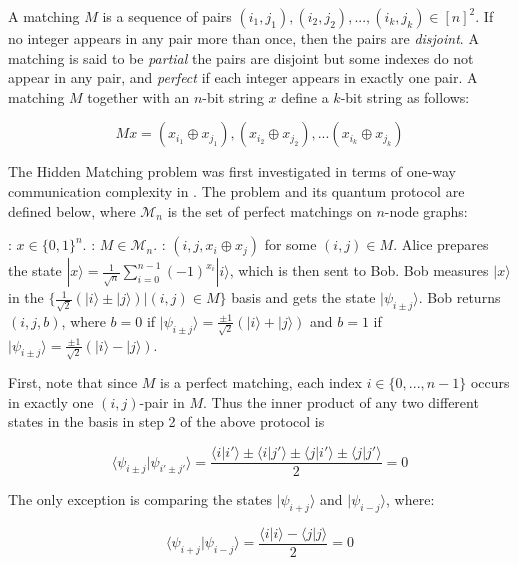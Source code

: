 \documentclass[a4paper]{article}
\begin{document}
        A matching $M$ is a sequence of pairs $(i_1, j_1), (i_2, j_2),...,(i_k, j_k) \in [n]^2$. If no integer appears in any pair more than once, then the pairs are {\em disjoint}. A matching is said to be {\em partial} the pairs are disjoint but some indexes do not appear in any pair, and {\em perfect} if each integer appears in exactly one pair. A matching $M$ together with an $n$-bit string $x$ define a $k$-bit string as follows:

        $$Mx = (x_{i_1} \oplus x_{j_1}), (x_{i_2} \oplus x_{j_2}), ... (x_{i_k} \oplus x_{j_k})$$

        The Hidden Matching problem was first investigated in terms of one-way communication complexity in \cite{doi:10.1137/060651835}. The problem and its quantum protocol are defined below, where $\mathcal{M}_n$ is the set of perfect matchings on $n$-node graphs:

        \begin{codebox}
            \zi {}: $x \in \{0,1\}^n$.
            \zi {}: $M \in \mathcal{M}_n$.
            \zi {}: $(i, j, x_i\oplus x_j)$ for some $(i, j) \in M$.
            \li Alice prepares the state $|x\rangle = \frac{1}{\sqrt{n}}\sum_{i = 0}^{n - 1}(-1)^{x_i}|i\rangle$, which is then sent to Bob.
            \li Bob measures $|x\rangle$ in the $\{\frac{1}{\sqrt{2}}(|i\rangle\pm|j\rangle)|(i, j) \in M\}$ basis and gets the state $|\psi_{i\pm j}\rangle$.
            \li Bob returns $(i, j, b)$, where $b = 0$ if $|\psi_{i\pm j}\rangle = \frac{\pm 1}{\sqrt{2}}(|i\rangle+|j\rangle)$ and $b = 1$ if $|\psi_{i\pm j}\rangle = \frac{\pm 1}{\sqrt{2}}(|i\rangle-|j\rangle)$.
        \end{codebox}

        First, note that since $M$ is a perfect matching, each index $i \in \{0,...,n-1\}$ occurs in exactly one $(i, j)$-pair in $M$. Thus the inner product of any two different states in the basis in step 2 of the above protocol is

        $$\langle\psi_{i\pm j}|\psi_{i'\pm j'}\rangle = \frac{\langle i|i'\rangle \pm \langle i|j'\rangle \pm \langle j|i'\rangle \pm \langle j|j'\rangle}{2} = 0$$

        The only exception is comparing the states $|\psi_{i + j}\rangle$ and $|\psi_{i - j}\rangle$, where:

        $$\langle\psi_{i + j}|\psi_{i - j}\rangle = \frac{\langle i|i\rangle - \langle j|j\rangle}{2} = 0$$
\end{document}
